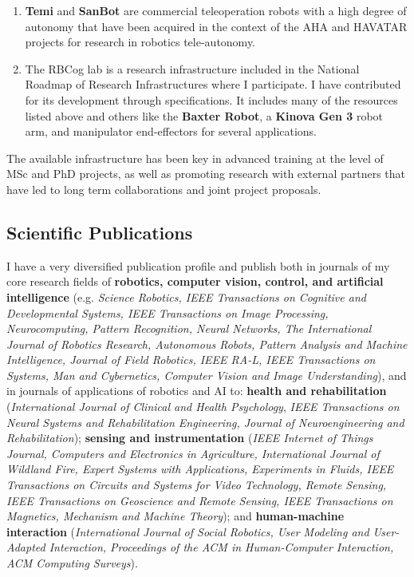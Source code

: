 \documentclass[
]{article}
\begin{document}
\begin{enumerate}
  \textbf{PEPE} is an augmented reality platform for physical and
  cognitive stimulation composed of a mobile base, an ultra-wide throw
  projector, a computer and a motion sensor that was developed in the
  AHA project. It has spawned other projects and has raised interest for
  commercial exploitation. A national patent has been granted in 2024,
  and international patents submitted.
\item
  \textbf{Temi} and \textbf{SanBot} are commercial teleoperation robots
  with a high degree of autonomy that have been acquired in the context
  of the AHA and HAVATAR projects for research in robotics
  tele-autonomy.
\item
  The RBCog lab is a research infrastructure included in the National
  Roadmap of Research Infrastructures where I participate. I have
  contributed for its development through specifications. It includes
  many of the resources listed above and others like the \textbf{Baxter
  Robot}, a \textbf{Kinova Gen 3} robot arm, and manipulator
  end-effectors for several applications.
\end{enumerate}

The available infrastructure has been key in advanced training at the
level of MSc and PhD projects, as well as promoting research with
external partners that have led to long term collaborations and joint
project proposals.

\subsection{Scientific Publications}\label{scientific-publications}

I have a very diversified publication profile and publish both in
journals of my core research fields of \textbf{robotics, computer
vision, control, and artificial intelligence} (e.g. \emph{Science
Robotics, IEEE Transactions on Cognitive and Developmental Systems, IEEE
Transactions on Image Processing,} \emph{Neurocomputing, Pattern
Recognition, Neural Networks, The International Journal of Robotics
Research, Autonomous Robots, Pattern Analysis and Machine Intelligence,
Journal of Field Robotics, IEEE RA-L, IEEE Transactions on Systems, Man
and Cybernetics, Computer Vision and Image Understanding}), and in
journals of applications of robotics and AI to: \textbf{health and
rehabilitation} (\emph{International Journal of Clinical and Health
Psychology}, \emph{IEEE Transactions on Neural Systems and
Rehabilitation Engineering, Journal of Neuroengineering and
Rehabilitation}); \textbf{sensing and instrumentation} (\emph{IEEE
Internet of Things Journal, Computers and Electronics in Agriculture,
International Journal of Wildland Fire, Expert Systems with
Applications, Experiments in Fluids, IEEE Transactions on Circuits and
Systems for Video Technology, Remote Sensing, IEEE Transactions on
Geoscience and Remote Sensing, IEEE Transactions on Magnetics, Mechanism
and Machine Theory}); and \textbf{human-machine interaction}
(\emph{International Journal of Social Robotics, User Modeling and
User-Adapted Interaction, Proceedings of the ACM in Human-Computer
Interaction, ACM Computing Surveys}).
\end{document}
